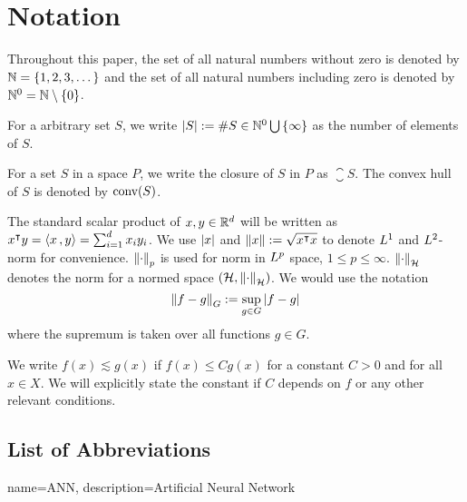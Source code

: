 \chapter*{Notation}
\label{c:Notation}

Throughout this paper, the set of all natural numbers without zero is denoted by
$\mathbb{N} = \{1,2,3,\dots\}$ and the set of all natural numbers including zero is
denoted by $\mathbb{N}^0 = \mathbb{N} \setminus \{0\}$. 

For a arbitrary set $S$, we write $\left| S \right| := \# S \in \mathbb{N}^0 \bigcup\,
\{\infty\}$ as the number of elements of $S$.

For a set $S$ in a space $P$, we write the closure of $S$ in $P$ as
$\closure{S}$. The convex hull of $S$ is denoted by $\textrm{conv}(S)$.

The standard scalar product of $x,y\in\mathbb{R}^d$ will be written as $x{}^{\intercal} y =
\left\langle x\, , y \right\rangle = \sum_{i=1}^d x_iy_i$. We use $\left| x \right|$ and $\left\| x \right\| := \sqrt{x{}^{\intercal}
x}$ to denote $L^{1}$ and $L^{2}$-norm for convenience. $\left\| \cdot \right\|_{p}$ is
used for norm in $L^{p}$ space, $1 \leq p \leq \infty$.
$\left\| \cdot \right\|_{\mathcal{H}}$ denotes the norm for a normed space $(\mathcal{H},
\left\| \cdot \right\|_{\mathcal{H}})$. We would use the notation
\begin{equation}
    \left\| f - g \right\|_{G} := \sup_{g\in G} \left| f - g \right|
\end{equation}
where the supremum is taken over all functions $g \in G$.

We write $f(x) \lesssim g(x)$ if $f(x) \leq C g(x)$ for a constant $C>0$ and for
all $x \in X$. We will explicitly state the constant if $C$ depends on $f$ or
any other relevant conditions.

\section*{List of Abbreviations}

\printglossary

{
    name=ANN,
    description={Artificial Neural Network}
}





